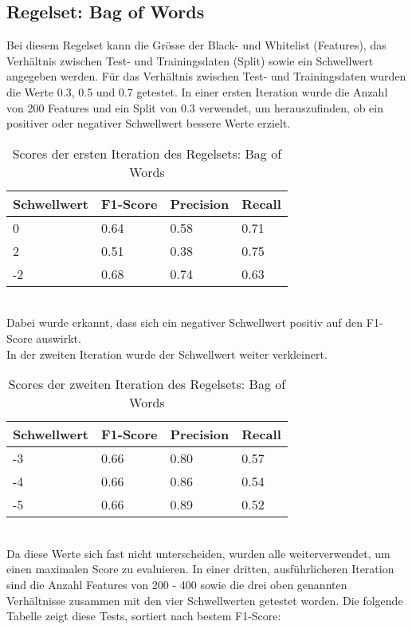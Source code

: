 \subsection{Regelset: Bag of Words}
Bei diesem Regelset kann die Grösse der Black- und Whitelist (Features), das Verhältnis zwischen Test- und Trainingsdaten (Split) sowie ein Schwellwert angegeben werden.
Für das Verhältnis zwischen Test- und Trainingsdaten wurden die Werte 0.3, 0.5 und 0.7 getestet.
In einer ersten Iteration wurde die Anzahl von 200 Features und ein Split von 0.3 verwendet, um herauszufinden, ob ein positiver oder negativer Schwellwert bessere Werte erzielt.\\
\begin{table}
	\caption{Scores der ersten Iteration des Regelsets: Bag of Words}
	\centering
\begin{tabular}{|l|l|l|l|}
	\hline
	Schwellwert & F1-Score & Precision & Recall\\
	\hline
	0 & 0.64 & 0.58 & 0.71 \\
	2 & 0.51 & 0.38 & 0.75 \\
	-2 & 0.68 & 0.74 & 0.63 \\
	\hline
\end{tabular}
\end{table}\\
Dabei wurde erkannt, dass sich ein negativer Schwellwert positiv auf den F1-Score auswirkt.\\
In der zweiten Iteration wurde der Schwellwert weiter verkleinert.\\
\begin{table}
	\caption{Scores der zweiten Iteration des Regelsets: Bag of Words}
	\centering
\begin{tabular}{|l|l|l|l|}
	\hline
	Schwellwert & F1-Score & Precision & Recall\\
	\hline
	-3 & 0.66 & 0.80 & 0.57 \\
	-4 & 0.66 & 0.86 & 0.54 \\
	-5 & 0.66 & 0.89 & 0.52 \\
	\hline
\end{tabular}
\end{table}\\ 
Da diese Werte sich fast nicht unterscheiden, wurden alle weiterverwendet, um einen maximalen Score zu evaluieren.
In einer dritten, ausführlicheren Iteration sind die Anzahl Features von 200 - 400 sowie die drei oben genannten Verhältnisse zusammen mit den vier Schwellwerten getestet worden. Die folgende Tabelle zeigt diese Tests, sortiert nach bestem F1-Score:\\
